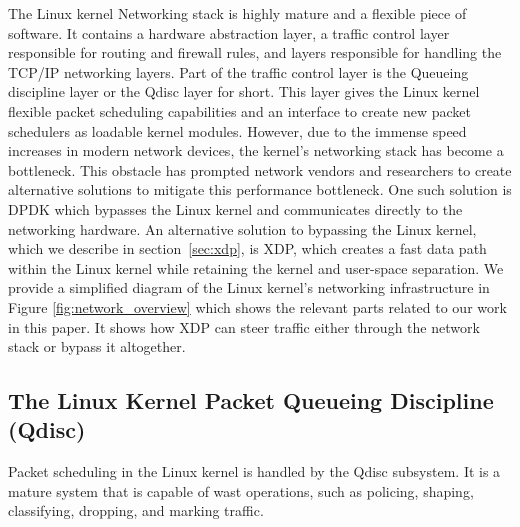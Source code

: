 \documentclass[sigconf, nonacm]{acmart}
\begin{document}
The Linux kernel Networking stack is highly mature and a flexible piece of software. It contains a hardware abstraction layer, a traffic control layer responsible for routing and firewall rules, and layers responsible for handling the TCP/IP networking layers. Part of the traffic control layer is the Queueing discipline layer or the Qdisc layer for short. This layer gives the Linux kernel flexible packet scheduling capabilities and an interface to create new packet schedulers as loadable kernel modules. However, due to the immense speed increases in modern network devices, the kernel's networking stack has become a bottleneck. This obstacle has prompted network vendors and researchers to create alternative solutions to mitigate this performance bottleneck. One such solution is DPDK which bypasses the Linux kernel and communicates directly to the networking hardware. An alternative solution to bypassing the Linux kernel, which we describe in section~\ref{sec:xdp}, is XDP, which creates a fast data path within the Linux kernel while retaining the kernel and user-space separation. We provide a simplified diagram of the Linux kernel's networking infrastructure in Figure \ref{fig:network_overview} which shows the relevant parts related to our work in this paper. It shows how XDP can steer traffic either through the network stack or bypass it altogether.



\subsection{The Linux Kernel Packet Queueing Discipline (Qdisc)}

Packet scheduling in the Linux kernel is handled by the Qdisc subsystem. It is a mature system that is capable of wast operations, such as policing, shaping, classifying, dropping, and marking traffic.
\end{document}
